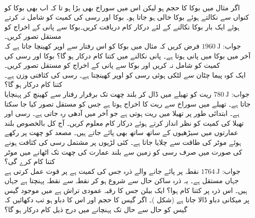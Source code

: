 \\
اگر مثال  میں بوکا کا حجم  ہو لیکن اس میں سوراخ بھی بڑا ہو تا کہ اب بھی  بوکا کو کنواں سے نکالتے ہوئے بوکا خالی ہو جاتا ہو۔ بوکا اور رسی کی کمیت کو شامل نہ کرتے ہوئے ایک بار بوکا نکالنے کے لئے درکار کام دریافت کریں۔بوکا سے پانی کے اخراج کو مستقل تصور کریں۔\\
جواب:\quad
$\SI{1960}{\joule}$
فرض کریں کہ مثال  میں بوکا کو اس رفتار سے اوپر کھینچا جاتا ہے کہ آخر میں بوکا میں  پانی ہوتا ہے۔ پانی نکالنے میں کتنا کام درکار ہو گا؟  بوکا اور رسی کی کمیت کو شامل نہ کریں اور بوکا سے پانی کے اخراج کو مستقل تصور کریں۔\\
ایک کوہ پیما چٹان سے لٹکی ہوئی  رسی کو اوپر کھینچتا ہے۔ رسی کی کثافتی وزن  ہے۔ کتنا کام درکار ہو گا؟\\
جواب:\quad
$\SI{780}{\joule}$
ریت کو تھیلے میں ڈال کر  بلند چھت تک برقرار رفتار سے کھینچ کر پہنچایا جاتا ہے۔ تھیلے میں سوراخ سے ریت کا اخراج ہوتا ہے جس کو مستقل تصور کیا جا سکتا ہے۔  ابتدائی طور پر تھیلا میں  ریت  ہوتی ہے جو  آخر میں آدھی رہ جاتی ہے۔ رسی اور تھیلا کی کمیت کو نظر انداز کرتے ہوئے درکار کام معلوم کریں۔
آج کل بالخصوص بلند  عمارتوں میں  سیڑھیوں کے ساتھ ساتھ   بھی پائے جاتے ہیں۔ مصعد کو چھت پر رکھے ہوئے موٹر کی طاقت سے چلایا جاتا ہے۔  کئی لڑیوں پر مشتمل رسی کی کثافت  ہونے کی صورت میں صرف رسی کو زمین سے   بلند عمارت کی چھت تک اٹھانے میں موٹر کتنا کام کرے گی؟\\
جواب:\quad
$\SI{1764}{\joule}$
نقطہ  پر پائے جانے والے ذرہ جس کی کمیت  ہے پر قوت  عمل کرتی ہے جہاں  مستقل ہے۔ یہ ذرہ ساکن حال سے شروع ہو کر نقطہ  سے نقطہ  پہنچتا ہے جہاں  ہیں۔ اس ذرہ پر کتنا کام ہوا؟
ایک بیلن جس کا رقبہ عمودی تراش  ہے میں موجود گیس پر میکانی دباو ڈالا جاتا ہے (شکل )۔ اگر گیس کا حجم  اور اس کا دباو  ہو تب دکھائیں کہ گیس کو  حال سے  حال تک پہنچانے میں درج ذیل  کام درکار ہو گا؟  
